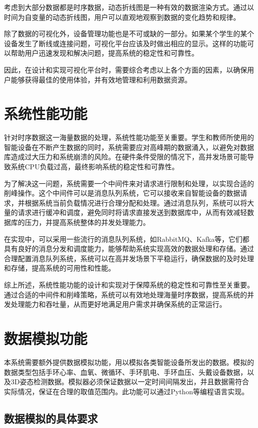 \documentclass[oneside]{xduugthesis}
\begin{document}
考虑到大部分数据都是时序数据，动态折线图是一种有效的数据渲染方式。通过以时间为自变量的动态折线图，用户可以直观地观察到数据的变化趋势和规律。

除了数据的可视化外，设备管理功能也是不可或缺的一部分。如果某个学生的某个设备发生了断线或连接问题，可视化平台应该及时做出相应的显示。这样的功能可以帮助用户迅速发现和解决问题，提高系统的稳定性和可靠性。

因此，在设计和实现可视化平台时，需要综合考虑以上各个方面的因素，以确保用户能够获得最佳的使用体验，并有效地管理和利用数据资源。

\section{系统性能功能}

针对时序数据这一海量数据的处理，系统性能功能至关重要。学生和教师所使用的智能设备在不断产生数据的同时，系统需要应对高峰期的数据涌入，以避免对数据库造成过大压力和系统崩溃的风险。在硬件条件受限的情况下，高并发场景可能导致系统CPU负载过高，最终影响系统的稳定性和可靠性。

为了解决这一问题，系统需要一个中间件来对请求进行限制和处理，以实现合适的削峰操作。这个中间件可以是消息队列系统，它可以接收来自智能设备的数据请求，并根据系统当前负载情况进行合理分配和处理。通过消息队列，系统可以将大量的请求进行缓冲和调度，避免同时将请求直接发送到数据库中，从而有效减轻数据库的压力，并提高系统整体的并发处理能力。

在实现中，可以采用一些流行的消息队列系统，如RabbitMQ、Kafka等，它们都具有良好的消息分发和调度能力，能够帮助系统实现高效的数据处理和存储。通过合理配置消息队列系统，系统可以在高并发场景下平稳运行，确保数据的及时处理和存储，提高系统的可用性和性能。

综上所述，系统性能功能的设计和实现对于保障系统的稳定性和可靠性至关重要。通过合适的中间件和削峰策略，系统可以有效地处理海量时序数据，提高系统的并发处理能力和吞吐量，从而更好地满足用户需求并确保系统的正常运行。


\section{数据模拟功能}

本系统需要额外提供数据模拟功能，用以模拟各类智能设备所发出的数据。模拟的数据类型包括手环心率、血氧、微循环、手环肌电、手环血压、头戴设备数据，以及3D姿态检测数据。模拟器必须保证数据以一定时间间隔发出，并且数据需符合实际情况，保证在合理的取值范围内。此功能可以通过Python等编程语言实现。

\subsection{数据模拟的具体要求}
\end{document}
